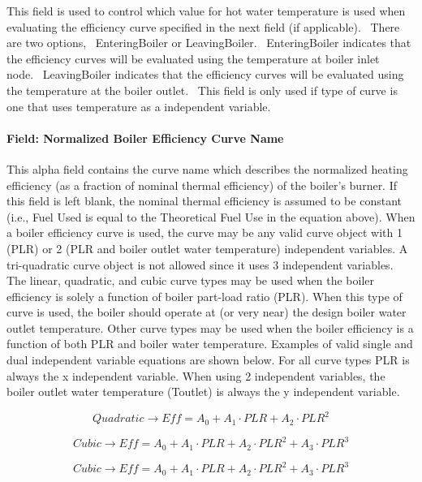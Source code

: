 This field is used to control which value for hot water temperature is used when evaluating the efficiency curve specified in the next field (if applicable).~ There are two options,~ EnteringBoiler or LeavingBoiler.~ EnteringBoiler indicates that the efficiency curves will be evaluated using the temperature at boiler inlet node.~ LeavingBoiler indicates that the efficiency curves will be evaluated using the temperature at the boiler outlet.~ This field is only used if type of curve is one that uses temperature as a independent variable.

\paragraph{Field: Normalized Boiler Efficiency Curve Name}\label{field-normalized-boiler-efficiency-curve-name}

This alpha field contains the curve name which describes the normalized heating efficiency (as a fraction of nominal thermal efficiency) of the boiler's burner. If this field is left blank, the nominal thermal efficiency is assumed to be constant (i.e., Fuel Used is equal to the Theoretical Fuel Use in the equation above). When a boiler efficiency curve is used, the curve may be any valid curve object with 1 (PLR) or 2 (PLR and boiler outlet water temperature) independent variables. A tri-quadratic curve object is not allowed since it uses 3 independent variables. The linear, quadratic, and cubic curve types may be used when the boiler efficiency is solely a function of boiler part-load ratio (PLR). When this type of curve is used, the boiler should operate at (or very near) the design boiler water outlet temperature. Other curve types may be used when the boiler efficiency is a function of both PLR and boiler water temperature. Examples of valid single and dual independent variable equations are shown below. For all curve types PLR is always the x independent variable. When using 2 independent variables, the boiler outlet water temperature (Toutlet) is always the y independent variable.

\begin{equation}
Quadratic \to Eff = {A_0} + {A_1}\cdot PLR + {A_2}\cdot PL{R^2}
\end{equation}

\begin{equation}
Cubic \to Eff = {A_0} + {A_1}\cdot PLR + {A_2}\cdot PL{R^2} + {A_3}\cdot PL{R^3}
\end{equation}

\begin{equation}
Cubic \to Eff = {A_0} + {A_1}\cdot PLR + {A_2}\cdot PL{R^2} + {A_3}\cdot PL{R^3}
\end{equation}

